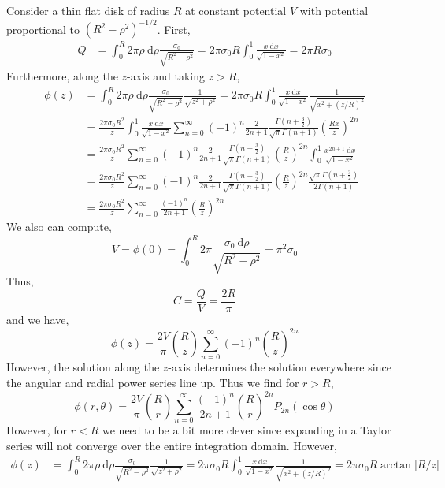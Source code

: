 \documentclass[12pt]{extarticle}
\renewcommand{\d}[1]{\: \mathrm{d}#1}
\theoremstyle{definition}
\begin{document}
Consider a thin flat disk of radius $R$ at constant potential $V$ with potential proportional to $(R^2 - \rho^2)^{-1/2}$. First,
\begin{align*}
Q & = \int_0^R 2 \pi \rho \d{\rho} \frac{\sigma_0}{\sqrt{R^2 - \rho^2}} = 2 \pi \sigma_0 R \int_0^1 \frac{x \d{x}}{\sqrt{1 - x^2}} = 2 \pi R \sigma_0 
\end{align*} 
Furthermore, along the $z$-axis and taking $z > R$,
\begin{align*}
\phi(z) & = \int_0^R 2 \pi \rho \d{\rho} \frac{\sigma_0}{\sqrt{R^2 - \rho^2}} \frac{1}{\sqrt{z^2 + \rho^2}} = 2 \pi \sigma_0 R \int_0^1 \frac{x \d{x}}{\sqrt{1 - x^2}} \frac{1}{\sqrt{x^2 + (z / R)^2}} 
\\
& = \frac{2 \pi \sigma_0 R^2}{z} \int_0^1 \frac{x \d{x}}{\sqrt{1 - x^2}} \sum_{n = 0}^\infty (-1)^n \frac{2}{2n+1} \frac{\Gamma(n + \tfrac{3}{2})}{\sqrt{\pi} \Gamma(n + 1)} \left( \frac{R x}{z} \right)^{2n} 
\\
& = \frac{2 \pi \sigma_0 R^2}{z}  \sum_{n = 0}^\infty (-1)^n \frac{2}{2n+1} \frac{\Gamma(n + \tfrac{3}{2})}{\sqrt{\pi} \Gamma(n + 1)}\left( \frac{R}{z} \right)^{2n}  \int_0^1 \frac{x^{2 n + 1} \d{x}}{\sqrt{1 - x^2}} 
\\
& = \frac{2 \pi \sigma_0 R^2}{z}  \sum_{n = 0}^\infty (-1)^n \frac{2}{2n+1} \frac{\Gamma(n + \tfrac{3}{2})}{\sqrt{\pi} \Gamma(n + 1)}\left( \frac{R}{z} \right)^{2n}  \frac{\sqrt{\pi} \Gamma(n + \tfrac{3}{2})}{2 \Gamma(n + 1)}
\\
& = \frac{2 \pi \sigma_0 R^2}{z}  \sum_{n = 0}^\infty \frac{(-1)^n}{2 n + 1} \left( \frac{R}{z} \right)^{2n} 
\end{align*}
We also can compute,
\[ V = \phi(0) = \int_0^R 2 \pi \frac{\sigma_0 \d{\rho}}{\sqrt{R^2 - \rho^2}} = \pi^2 \sigma_0 \]
Thus,
\[ C = \frac{Q}{V} = \frac{2R}{\pi} \]
and we have,
\[ \phi(z) = \frac{2V}{\pi} \left( \frac{R}{z} \right) \sum_{n = 0}^\infty (-1)^n \left( \frac{R}{z} \right)^{2n} \]
However, the solution along the $z$-axis determines the solution everywhere since the angular and radial power series line up. Thus we find for $r > R$,
\[ \phi(r, \theta) = \frac{2 V}{\pi} \left( \frac{R}{r} \right) \sum_{n = 0}^\infty \frac{(-1)^n}{2n + 1} \left( \frac{R}{r} \right)^{2n} P_{2n}(\cos{\theta}) \]
However, for $r < R$ we need to be a bit more clever since expanding in a Taylor series will not converge over the entire integration domain. However, 
\begin{align*}
\phi(z) & = \int_0^R 2 \pi \rho \d{\rho} \frac{\sigma_0}{\sqrt{R^2 - \rho^2}} \frac{1}{\sqrt{z^2 + \rho^2}} = 2 \pi \sigma_0 R \int_0^1 \frac{x \d{x}}{\sqrt{1 - x^2}} \frac{1}{\sqrt{x^2 + (z / R)^2}} = 2 \pi \sigma_0 R \arctan{|R/z|}
\end{align*}
\end{document}

